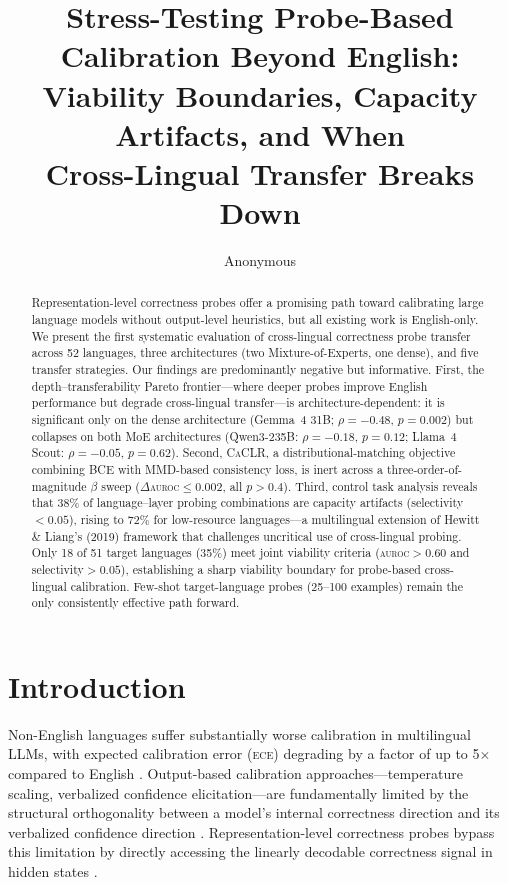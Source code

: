 \documentclass[11pt,a4paper]{article}
\title{Stress-Testing Probe-Based Calibration Beyond English:\\Viability Boundaries, Capacity Artifacts, and When\\Cross-Lingual Transfer Breaks Down}
\author{Anonymous}
\newcommand{\auroc}{\textsc{auroc}}
\newcommand{\ece}{\textsc{ece}}
\newcommand{\caclr}{\textsc{CaCLR}}
\begin{document}
\maketitle

\begin{abstract}
Representation-level correctness probes offer a promising path toward calibrating large language models without output-level heuristics, but all existing work is English-only.
We present the first systematic evaluation of cross-lingual correctness probe transfer across 52 languages, three architectures (two Mixture-of-Experts, one dense), and five transfer strategies.
Our findings are predominantly negative but informative.
First, the depth--transferability Pareto frontier---where deeper probes improve English performance but degrade cross-lingual transfer---is architecture-dependent: it is significant only on the dense architecture (Gemma~4 31B; $\rho{=}{-}0.48$, $p{=}0.002$) but collapses on both MoE architectures (Qwen3-235B: $\rho{=}{-}0.18$, $p{=}0.12$; Llama~4 Scout: $\rho{=}{-}0.05$, $p{=}0.62$).
Second, \caclr{}, a distributional-matching objective combining BCE with MMD-based consistency loss, is inert across a three-order-of-magnitude $\beta$ sweep ($\Delta$\auroc{}${\leq}0.002$, all $p{>}0.4$).
Third, control task analysis reveals that 38\% of language--layer probing combinations are capacity artifacts (selectivity${<}0.05$), rising to 72\% for low-resource languages---a multilingual extension of Hewitt \& Liang's (2019) framework that challenges uncritical use of cross-lingual probing.
Only 18 of 51 target languages (35\%) meet joint viability criteria (\auroc{}${>}0.60$ and selectivity${>}0.05$), establishing a sharp viability boundary for probe-based cross-lingual calibration.
Few-shot target-language probes (25--100 examples) remain the only consistently effective path forward.
\end{abstract}

\section{Introduction}
\label{sec:intro}

Non-English languages suffer substantially worse calibration in multilingual LLMs, with expected calibration error (\ece{}) degrading by a factor of up to 5$\times$ compared to English \cite{ahuja2024megaverse}.
Output-based calibration approaches---temperature scaling, verbalized confidence elicitation---are fundamentally limited by the structural orthogonality between a model's internal correctness direction and its verbalized confidence direction \cite{miao2026orthogonality}.
Representation-level correctness probes bypass this limitation by directly accessing the linearly decodable correctness signal in hidden states \cite{miao2026coral,burns2023discovering}.
\end{document}
